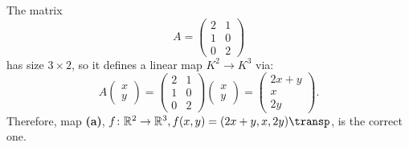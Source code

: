 \begin{exercisesolution*}
\label{sol:matrix_map_mc}
The matrix
\[
A = \begin{pmatrix} 2 & 1 \\ 1 & 0 \\ 0 & 2 \end{pmatrix}
\]
has size $3 \times 2$, so it defines a linear map $K^2 \to K^3$ via:
\[
A \begin{pmatrix} x \\ y \end{pmatrix} = \begin{pmatrix} 2 & 1 \\ 1 & 0 \\ 0 & 2 \end{pmatrix} \begin{pmatrix} x \\ y \end{pmatrix} = \begin{pmatrix} 2x + y \\ x \\ 2y \end{pmatrix}.
\]
Therefore, map \textbf{(a)}, $f \colon \mathbb{R}^2 \to \mathbb{R}^3, f(x, y) = (2x + y, x, 2y)\transp$, is the correct one.
\end{exercisesolution*}

